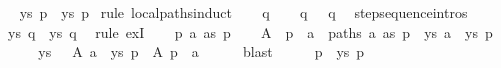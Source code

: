 \begin{isabellebody}
\ \isamarkupfalse%
\ {\isachardoublequoteopen}{\isasymexists}ys{\isachardot}{\kern0pt}\ p\ {\isasymmapsto}{\isachardollar}{\kern0pt}\ ys\ p{\isacharprime}{\kern0pt}{\isachardoublequoteclose}\isanewline
{}\isamarkupfalse%
\ {\isacharparenleft}{\kern0pt}rule\ local{\isachardot}{\kern0pt}paths{\isachardot}{\kern0pt}induct{\isacharparenright}{\kern0pt}\isanewline
\ \ \isamarkupfalse%
\ q\isanewline
\ \ \isamarkupfalse%
\ {\isachardoublequoteopen}q\ {\isasymmapsto}{\isachardollar}{\kern0pt}\ {\isacharbrackleft}{\kern0pt}{\isacharbrackright}{\kern0pt}\ q{\isachardoublequoteclose}\ \isamarkupfalse%
\ step{\isacharunderscore}{\kern0pt}sequence{\isachardot}{\kern0pt}intros{\isacharparenleft}{\kern0pt}{}{\isacharparenright}{\kern0pt}\isacommand{{\isachardot}{\kern0pt}}\isamarkupfalse%
\isanewline
\ \ \isamarkupfalse%
\ \isamarkupfalse%
\ {\isachardoublequoteopen}{\isasymexists}ys{\isachardot}{\kern0pt}\ q\ {\isasymmapsto}{\isachardollar}{\kern0pt}\ ys\ q{\isachardoublequoteclose}\ \isamarkupfalse%
\ {\isacharparenleft}{\kern0pt}rule\ exI{\isacharparenright}{\kern0pt}\isanewline
{}\isamarkupfalse%
\isanewline
\ \ \isamarkupfalse%
\ p\ a\ as\ p{\isacharprime}{\kern0pt}{\isacharprime}{\kern0pt}\isanewline
\ \ \isamarkupfalse%
\ A{}{\isacharcolon}{\kern0pt}\ {\isachardoublequoteopen}{\isasymexists}{\isasymalpha}{\isachardot}{\kern0pt}\ p\ {\isasymmapsto}{\isasymalpha}\ a\ {\isasymand}\ paths\ a\ as\ p{\isacharprime}{\kern0pt}{\isacharprime}{\kern0pt}\ {\isasymand}\ {\isacharparenleft}{\kern0pt}{\isasymexists}ys{\isachardot}{\kern0pt}\ a\ {\isasymmapsto}{\isachardollar}{\kern0pt}\ ys\ p{\isacharprime}{\kern0pt}{\isacharprime}{\kern0pt}{\isacharparenright}{\kern0pt}{\isachardoublequoteclose}\isanewline
\ \ \isamarkupfalse%
\ \isamarkupfalse%
\ ys\ {\isasymalpha}\ \ A{}{\isacharcolon}{\kern0pt}\ {\isachardoublequoteopen}a\ {\isasymmapsto}{\isachardollar}{\kern0pt}\ ys\ p{\isacharprime}{\kern0pt}{\isacharprime}{\kern0pt}{\isachardoublequoteclose}\ \ A{}{\isacharcolon}{\kern0pt}\ {\isachardoublequoteopen}p\ {\isasymmapsto}{\isasymalpha}\ a{\isachardoublequoteclose}\isanewline
\ \ \ \ \isamarkupfalse%
\ blast\isanewline
\ \ \isamarkupfalse%
\ \isamarkupfalse%
\ {\isachardoublequoteopen}p\ {\isasymmapsto}{\isachardollar}{\kern0pt}\ {\isacharparenleft}{\kern0pt}{\isasymalpha}{\isacharhash}{\kern0pt}ys{\isacharparenright}{\kern0pt}\ p{\isacharprime}{\kern0pt}{\isacharprime}{\kern0pt}{\isachardoublequoteclose}\ \isamarkupfalse%

\end{isabellebody}
